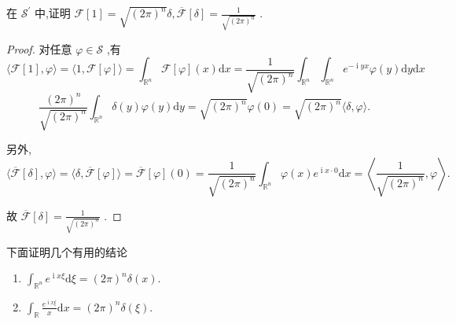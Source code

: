 \documentclass[lang=cn,newtx,10pt,scheme=chinese,thmcnt=chapter]{elegantbook}
\newcommand{\dif}{\mathrm{d}}
\newcommand{\ci}{\operatorname{i}}
\begin{document}
\begin{example}
  在 \({\mathcal{S}}^{\prime }\) 中,证明 \(\mathcal{F}\left\lbrack  1\right\rbrack   = \sqrt{{\left( 2\pi \right) }^{n}}\delta ,\overline{\mathcal{F}}\left\lbrack  \delta \right\rbrack   = \frac{1}{\sqrt{{\left( 2\pi \right) }^{n}}}\) .
\end{example}

 \begin{proof}
  对任意 \(\varphi  \in  \mathcal{S}\) ,有  \begin{equation*}
  \langle \mathcal{F}\left\lbrack  1\right\rbrack  ,\varphi \rangle  = \langle 1,\mathcal{F}\left\lbrack  \varphi \right\rbrack  \rangle  = {\int }_{{\mathbb{R}}^{n}}\mathcal{F}\left\lbrack  \varphi \right\rbrack  \left( x\right) {\dif x} = \frac{1}{\sqrt{{\left( 2\pi \right) }^{n}}}{\int }_{{\mathbb{R}}^{n}}\int _{\mathbb{R}^n}e^{-\ci yx}\varphi(y)\dif y {\dif x}
  \end{equation*}\begin{equation*}
 \frac{(2\pi)^n}{\sqrt{{\left( 2\pi \right) }^{n}}}{\int }_{{\mathbb{R}}^{n}}\delta(y)\varphi(y)\dif y = \sqrt{{\left( 2\pi \right) }^{n}}\varphi \left( 0\right)  = \sqrt{{\left( 2\pi \right) }^{n}}\langle \delta ,\varphi \rangle .
  \end{equation*}
  
  另外,\begin{equation*}
  \langle \overline{\mathcal{F}}\left\lbrack  \delta \right\rbrack  ,\varphi \rangle  = \langle \delta ,\overline{\mathcal{F}}\left\lbrack  \varphi \right\rbrack  \rangle  = \overline{\mathcal{F}}\left\lbrack  \varphi \right\rbrack  \left( 0\right)  = \frac{1}{\sqrt{{\left( 2\pi \right) }^{n}}}{\int }_{{\mathbb{R}}^{n}}\varphi \left( x\right) {e}^{{\ci x} \cdot  0}{\dif x} = \left\langle  {\frac{1}{\sqrt{{\left( 2\pi \right) }^{n}}},\varphi }\right\rangle  .
  \end{equation*}
  
  故 \(\overline{\mathcal{F}}\left\lbrack  \delta \right\rbrack   = \frac{1}{\sqrt{{\left( 2\pi \right) }^{n}}}\) .
\end{proof}
\begin{example}
    下面证明几个有用的结论
    \begin{enumerate}
        \item $\int_{\mathbb{R}^n}e^{\ci x\xi}\dif \xi=(2\pi)^n\delta(x)$.
        \item $\int_{\mathbb{R}}\frac{e^{\ci x\xi}}{x}\dif x=(2\pi)^n\delta(\xi)$.
    \end{enumerate}
\end{example}
\end{document}

